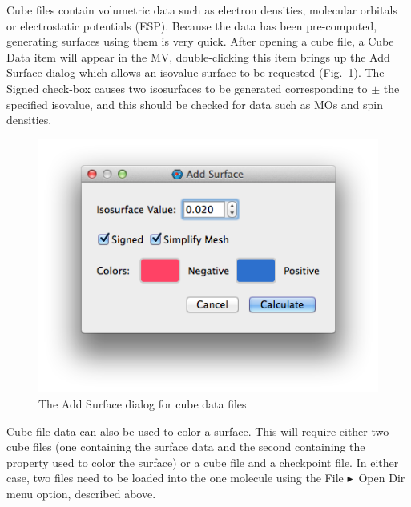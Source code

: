 \documentclass[a4paper,12pt]{article}
\newcommand{\bt}{\ensuremath{\blacktriangleright}}
\begin{document}
Cube files contain volumetric data such as electron densities, molecular
orbitals or electrostatic potentials (ESP).  Because the data has been
pre-computed, generating surfaces using them is very quick.  After opening a
cube file, a Cube Data item will appear in the MV, double-clicking this item
brings up the Add Surface dialog which allows an isovalue surface to be
requested (Fig.~\ref{fig:cubefile}).  The Signed check-box causes two
isosurfaces to be generated corresponding to $\pm$ the specified isovalue, and
this should be checked for data such as MOs and spin densities.
\begin{figure}[h]
\begin{center}
\includegraphics[scale=0.4]{figures/AddSurface.png}
\caption{The Add Surface dialog for cube data files}
\label{fig:cubefile}
\end{center}
\end{figure}

Cube file data can also be used to color a surface.  This will require either
two cube files (one containing the surface data and the second containing the
property used to color the surface) or a cube file and a checkpoint file.  In
either case, two files need to be loaded into the one molecule using the File
\bt\ Open Dir menu option, described above.
\end{document}
